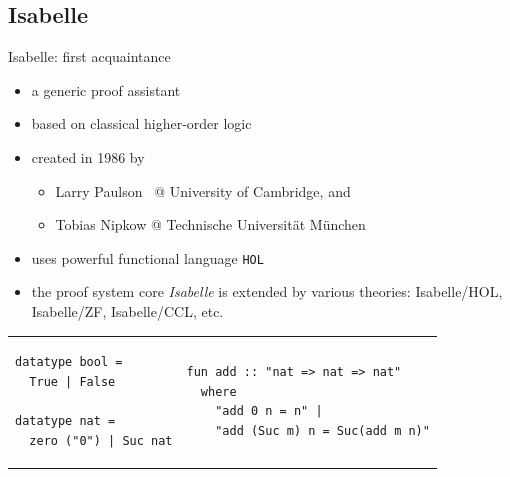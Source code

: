 \documentclass[aspectratio=169, 12pt, fleqn]{beamer}
\begin{document}
\subsection{Isabelle}

\begin{frame}[fragile]{Isabelle: first acquaintance}


\vspace{10pt}
\begin{itemize}
  \item a generic proof assistant
  \item based on classical higher-order logic
  \item created in 1986 by
    \begin{itemize}
    \item Larry Paulson \ @ University of Cambridge, and
    \item Tobias Nipkow @ Technische Universit\"{a}t M\"{u}nchen
    \end{itemize}
  \item \textcolor{dkgray}{ uses powerful functional language \texttt{HOL} }
  \item \textcolor{dkgray}{ the proof system core \textit{Isabelle} is extended by various theories: Isabelle/HOL, Isabelle/ZF, Isabelle/CCL, etc. }
\end{itemize}

\begin{tabular}{p{.43\linewidth} p{.58\linewidth}}
 \begin{lstlisting}[language=isabelle, caption={Definition of basic datatypes 
%in Isabelle:
}]
datatype bool = 
  True | False
  
datatype nat = 
  zero ("0") | Suc nat
\end{lstlisting}
&
\begin{lstlisting}[language=isabelle,caption={Definition of addition over \texttt{nat} }]
fun add :: "nat => nat => nat"
  where
    "add 0 n = n" |
    "add (Suc m) n = Suc(add m n)"
\end{lstlisting}
\end{tabular}

\end{frame}
\end{document}
